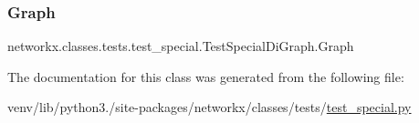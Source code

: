 \subsubsection{\texorpdfstring{Graph}{Graph}}
{\footnotesize\ttfamily networkx.\+classes.\+tests.\+test\+\_\+special.\+Test\+Special\+Di\+Graph.\+Graph}



The documentation for this class was generated from the following file\+:\begin{DoxyCompactItemize}
\item 
venv/lib/python3./site-\/packages/networkx/classes/tests/\hyperlink{test__special_8py}{test\+\_\+special.\+py}\end{DoxyCompactItemize}
